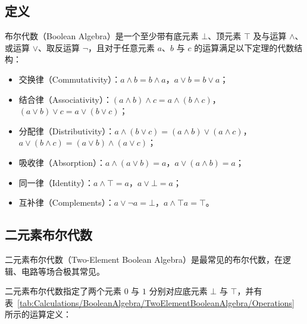     \subsection{定义}\label{subsec:Calculations/BooleanAlgebra/Definition}
        布尔代数（Boolean Algebra）是一个至少带有底元素 $\bot$、顶元素 $\top$ 及与运算 $\wedge$、或运算 $\vee$、取反运算 $\neg$，且对于任意元素 $a$、$b$ 与 $c$ 的运算满足以下定理的代数结构：
        \begin{itemize}
            \item 交换律（Commutativity）：$a \wedge b = b \wedge a$，$a \vee b = b \vee a$；
            \item 结合律（Associativity）：$(a \wedge b) \wedge c = a \wedge (b \wedge c)$，$(a \vee b) \vee c = a \vee (b \vee c)$；
            \item 分配律（Distributivity）：$a \wedge (b \vee c) = (a \wedge b) \vee (a \wedge c)$，$a \vee (b \wedge c) = (a \vee b) \wedge (a \vee c)$；
            \item 吸收律（Absorption）：$a \wedge (a \vee b) = a$，$a \vee (a \wedge b) = a$；
            \item 同一律（Identity）：$a \wedge \top = a$，$a \vee \bot = a$；
            \item 互补律（Complements）：$a \vee \neg a = \bot$，$a \wedge \top a = \top$。
        \end{itemize}

    \subsection{二元素布尔代数}\label{subsec:Calculations/BooleanAlgebra/TwoElementBooleanAlgebra}
        二元素布尔代数（Two-Element Boolean Algebra）是最常见的布尔代数，在逻辑、电路等场合极其常见。

        二元素布尔代数指定了两个元素 $0$ 与 $1$ 分别对应底元素 $\bot$ 与 $\top$，并有表~\ref{tab:Calculations/BooleanAlgebra/TwoElementBooleanAlgebra/Operations} 所示的运算定义：

